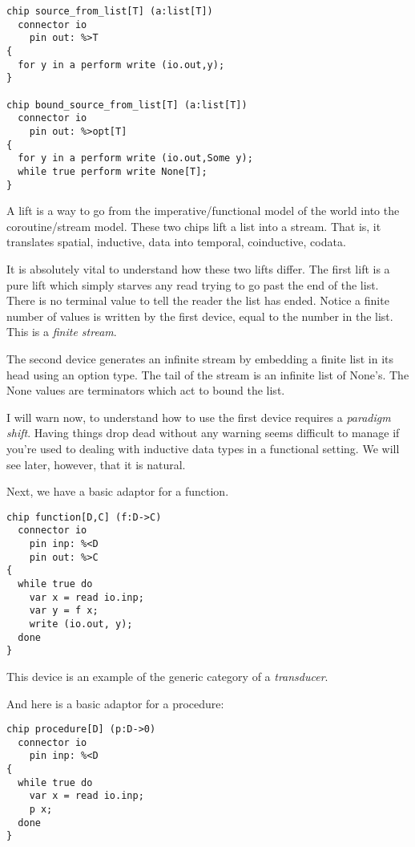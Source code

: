 \documentclass[oneside]{book}
\begin{document}
\begin{verbatim}
chip source_from_list[T] (a:list[T])
  connector io
    pin out: %>T
{
  for y in a perform write (io.out,y);
}

chip bound_source_from_list[T] (a:list[T])
  connector io
    pin out: %>opt[T]
{
  for y in a perform write (io.out,Some y);
  while true perform write None[T];
}
\end{verbatim}

A lift is a way to go from the imperative/functional model
of the world into the coroutine/stream model. These
two chips lift a list into a stream. That is, it translates
spatial, inductive, data into temporal, coinductive, codata.

It is absolutely vital to understand how these two
lifts differ. The first lift is a pure lift
which simply starves any read trying to go past the
end of the list. There is no terminal value to tell the
reader the list has ended. Notice a finite number
of values is written by the first device, equal to the
number in the list. This is a {\em finite stream}.

The second device generates an infinite stream
by embedding a finite list in its head using 
an option type. The tail of the stream is an infinite
list of None's. The None values are terminators which
act to bound the list.

I will warn now, to understand how to use the first device
requires a {\em paradigm shift}. Having things drop dead without
any warning seems difficult to manage if you're used
to dealing with inductive data types in a functional
setting. We will see later, however, that it is natural.

Next, we have a basic adaptor for a function.

\begin{verbatim}
chip function[D,C] (f:D->C)
  connector io
    pin inp: %<D
    pin out: %>C
{
  while true do
    var x = read io.inp;
    var y = f x; 
    write (io.out, y);
  done
}
\end{verbatim}


This device is an example of the generic category 
of a {\em transducer}.  

And here is a basic adaptor for a procedure:

\begin{verbatim}
chip procedure[D] (p:D->0)
  connector io
    pin inp: %<D
{
  while true do 
    var x = read io.inp;
    p x;
  done
}
\end{verbatim}
\end{document}
